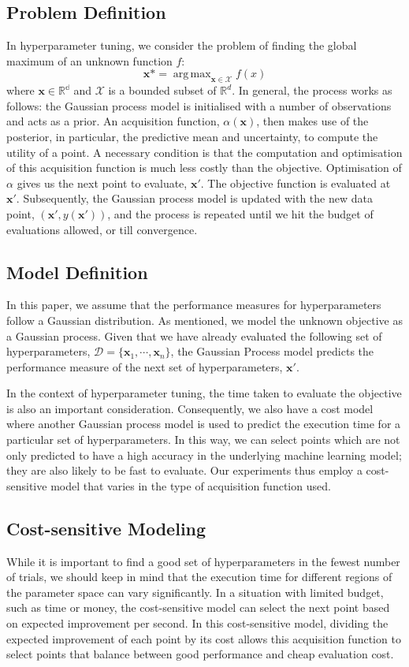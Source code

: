 \documentclass[letterpaper]{article}
\DeclareMathOperator*{\argmax}{arg\,max}
\begin{document}
\subsection{Problem Definition}
In hyperparameter tuning, we consider the problem of finding the global maximum of
an unknown function $f$:
$$\textbf{x*}=\argmax_{\textbf{x}\in\mathcal{X}}{f(x)}$$
where $\textbf{x} \in \mathbb{R^d}$ and $\mathcal{X}$ is a bounded subset of
$\mathbb{R}^d$. In general, the process works as follows: the Gaussian process model
is initialised with a number of observations and acts as a prior.
An acquisition function, $\alpha(\textbf{x})$, then makes use
of the posterior, in particular, the predictive mean and uncertainty,
to compute the utility of a point. A necessary condition is that the computation and
optimisation of this acquisition function is much less costly than the objective.
Optimisation of $\alpha$ gives us the next point to evaluate, $\textbf{x}'$. The
objective function is evaluated at $\textbf{x}'$. Subsequently, the Gaussian process
model is updated with the new data point, $(\textbf{x}', y(\textbf{x}'))$, and the
process is repeated until we hit the budget of evaluations allowed, or till
convergence.

\subsection{Model Definition}
In this paper, we assume that the performance measures for hyperparameters follow a
Gaussian distribution. As mentioned, we model the unknown objective as a Gaussian process.
Given that we have already evaluated the following set of hyperparameters,
$\mathcal{D}=\{\textbf{x}_1, \cdots, \textbf{x}_n\}$, the Gaussian
Process model predicts the performance measure of the next set of hyperparameters,
$\textbf{x}'$.

In the context of hyperparameter tuning, the time taken to evaluate the objective is
also an important consideration. Consequently, we also have a cost model where
another Gaussian process model is used to predict the execution time for a particular
set of hyperparameters. In this way, we can select points which are not only
predicted to have a high accuracy in the underlying machine learning model; they
are also likely to be fast to evaluate. Our experiments thus employ
a cost-sensitive model that varies in the type of acquisition function used.

\subsection{Cost-sensitive Modeling}
While it is important to find a good set of hyperparameters in the fewest number of
trials, we should keep in mind that the execution time for different regions of the
parameter space can vary significantly. In a situation with limited budget, such as
time or money, the cost-sensitive model can select the next point based on expected
improvement per second. In this cost-sensitive model, dividing the expected improvement
of each point by its cost allows this acquisition function to select points that
balance between good performance and cheap evaluation cost.
\end{document}
